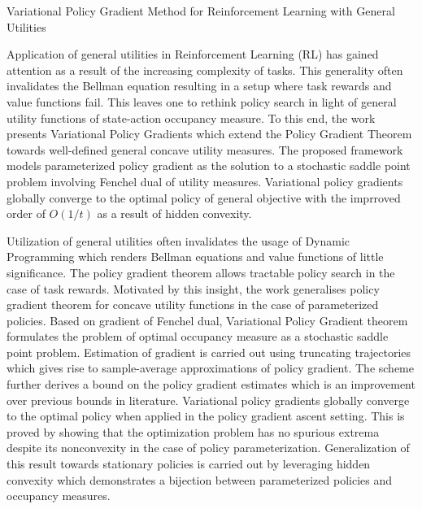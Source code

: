\documentclass[11pt,letterpaper]{article}
\begin{document}
\begin{center}
  \large{Variational Policy Gradient Method for Reinforcement Learning with General Utilities}
\end{center}
Application of general utilities in Reinforcement Learning (RL) has gained attention as a result of the increasing complexity of tasks. This generality often invalidates the Bellman equation resulting in a setup where task rewards and value functions fail. This leaves one to rethink policy search in light of general utility functions of state-action occupancy measure. To this end, the work presents Variational Policy Gradients which extend the Policy Gradient Theorem towards well-defined general concave utility measures. The proposed framework models parameterized policy gradient as the solution to a stochastic saddle point problem involving Fenchel dual of utility measures. Variational policy gradients globally converge to the optimal policy of general objective with the imprroved order of $O(1/t)$ as a result of hidden convexity. 

Utilization of general utilities often invalidates the usage of Dynamic Programming which renders Bellman equations and value functions of little significance. The policy gradient theorem allows tractable policy search in the case of task rewards. Motivated by this insight, the work generalises policy gradient theorem for concave utility functions in the case of parameterized policies. Based on gradient of Fenchel dual, Variational Policy Gradient theorem formulates the problem of optimal occupancy measure as a stochastic saddle point problem. Estimation of gradient is carried out using truncating trajectories which gives rise to sample-average approximations of policy gradient. The scheme further derives a bound on the policy gradient estimates which is an improvement over previous bounds in literature. Variational policy gradients globally converge to the optimal policy when applied in the policy gradient ascent setting. This is proved by showing that the optimization problem has no spurious extrema despite its nonconvexity in the case of policy parameterization. Generalization of this result towards stationary policies is carried out by leveraging hidden convexity which demonstrates a bijection between parameterized policies and occupancy measures. 
\end{document}
